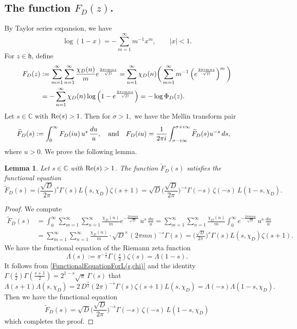 \documentclass[11pt]{amsart}
\numberwithin{equation}{section}
\newtheorem{lem}[thm]{Lemma}
\theoremstyle{remark}
\begin{document}
\subsection{The function $F_D(z)$.} 
By Taylor series expansion, we have
\[
\log(1-x) = -\sum\limits_{m=1}^\infty m^{-1} x^m, \quad \quad |x|<1.
\]
For $z \in \mathfrak{h}$, define
 \begin{align}
 F_D(z) & := \sum_{m=1}^\infty \sum_{n=1}^\infty \frac{{\chi_{D}}(n)}{m} e^{\frac{2\pi i mnz}{\sqrt{D}}}  =\sum_{n=1}^\infty {\chi_{D}}(n)\bigg (\sum_{m=1}^\infty m^{-1} \left(e^{\frac{2\pi i mnz}{\sqrt{D}}}\right)^m    \bigg )\notag \\
 & = -\sum_{n=1}^\infty {\chi_{D}}(n)\log\left (1 - e^{\frac{2\pi i mnz}{\sqrt{D}}} \right) =  - \log \Phi_{D}(z). \label{Fchi}
 \end{align}
Let $s\in\mathbb C$ with ${\rm Re}(s)>1$. Then for $\sigma>1,$
we have the Mellin transform pair
\begin{align*}
\widetilde{F}_D(s) &:= \int_0^\infty F_{D}(iu)\, u^s \, \frac{du}{u}, \quad \textrm{and} \quad
F_{D}(iu)= \frac{1}{2\pi i} \int_{\sigma-i\infty}^{\sigma+i\infty} \widetilde{F}_{D}(s) u^{-s} \, ds, \notag
\end{align*}
where $u>0$. We prove the following lemma.    
\begin{lem} \label{FunctionalEquationTildeFchi} Let $s\in\mathbb C$ with ${\rm Re}(s)>1$. The function  $\widetilde {F}_{D}(s)$ satisfies the functional equation
$$\widetilde {F}_{D}(s) = \bigg(\frac{\sqrt{D}}{2\pi}\bigg)^{s} \Gamma(s) L(s,{\chi_{D}}) \zeta(s+1) = \sqrt{D}\bigg(\frac{\sqrt{D}}{2\pi}\bigg)^{-s}\Gamma(-s)\,  \zeta(-s)\, L(1-s,{\chi_{D}}).$$
  \end{lem} 
  \begin{proof} 
  We compute
  \begin{align*}
 \widetilde {F}_{D}(s) & = \int_0^\infty  \sum_{m=1}^\infty \sum_{n=1}^\infty \frac{{\chi_{D}}(n)}{m} e^{-\frac{2\pi  mnu}{\sqrt{D}}} \, u^s \,\frac{du}{u} =  \sum_{m=1}^\infty \sum_{n=1}^\infty  \frac{{\chi_{D}}(n)}{m} \int_0^\infty   e^{-\frac{2\pi  mnu}{\sqrt{D}}} \, u^s \,\frac{du}{u}\\
  & =  \sum_{m=1}^\infty \sum_{n=1}^\infty  \frac{{\chi_{D}}(n)}{m}\cdot \sqrt{D}^s\, (2\pi m n)^{-s} \Gamma(s) = \bigg(\frac{\sqrt{D}}{2\pi}\bigg)^{s} \Gamma(s) L(s,{\chi_{D}}) \zeta(s+1).
 \end{align*}   
We have the functional equation of the Riemann zeta function
$$\Lambda(s) := \pi^{-\frac{s}{2}}  \Gamma\left(\tfrac{s}{2} \right) \zeta(s) =\Lambda(1-s).$$
It follows from \eqref{FunctionalEquationForL(s,chi)} and the identity $\Gamma\left(\frac{s}{2}\right) \Gamma\left(\frac{s+1}{2}\right)= 2^{1-s} \sqrt{\pi}\,\Gamma(s)$ that
$$\Lambda(s+1)\Lambda(s,{\chi_{D}}) = 2\, D^{\frac{s}{2}} (2\pi)^{-s} \Gamma(s) \zeta(s+1) L(s,{\chi_{D}}) = \Lambda(-s)\Lambda(1-s,{\chi_{D}}).$$
Then we have the functional equation
  $$\widetilde {F}_{D}(s) = \sqrt{D}\bigg(\frac{\sqrt{D}}{2\pi}\bigg)^{-s}\Gamma(-s)\,  \zeta(-s)\, L(1-s,{\chi_{D}})
 $$
 which completes the proof.
\end{proof}
\end{document}
